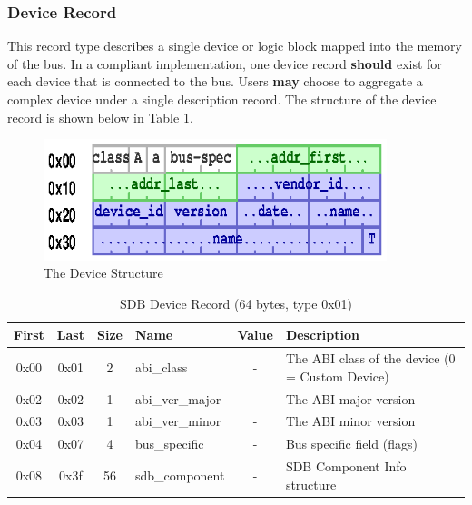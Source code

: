 \documentclass[a4paper, 12pt]{article}
\begin{document}
\subsubsection{Device Record}

This record type describes a single device or logic block mapped into the memory of the
bus. In a compliant implementation, one device record \textbf{should} exist for each device that is
connected to the bus. Users \textbf{may} choose to aggregate a complex device under a single
description record. The structure of the device record is shown below in Table
\ref{sdb_device}.

\begin{figure}[h]
\centering%
\includegraphics[width=100mm]{img/sdb-device.ps}
\caption{The Device Structure}
\label{fig:FigureDevice}
\end{figure}

\begin{center}
  \begin{savenotes}
    \begin{table}[!ht]\footnotesize
      \caption{SDB Device Record (64 bytes, type 0x01)}\label{sdb_device}\centering
        \begin{tabular}{| c | c | c | l | c | p{5cm} |} \hline
        First & Last & Size & Name & Value & Description \\ \hline
        0x00 & 0x01 & 2 & abi\_class & - & The ABI class of the device (0 = Custom Device) \\ \hline
        0x02 & 0x02 & 1 & abi\_ver\_major & - & The ABI major version \\ \hline
        0x03 & 0x03 & 1 & abi\_ver\_minor & - & The ABI minor version \\ \hline
        0x04 & 0x07 & 4 & bus\_specific & - & Bus specific field (flags) \\ \hline
        0x08 & 0x3f & 56 & sdb\_component & - & SDB Component Info structure \\ \hline
        \end{tabular}
    \end{table}
  \end{savenotes}
\end{center}
\end{document}
